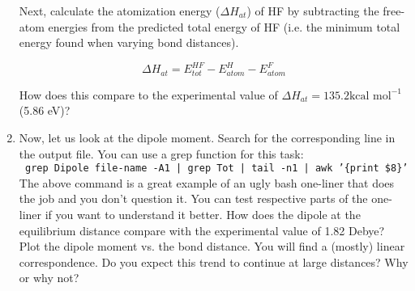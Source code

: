 \begin{enumerate}

Next, calculate the atomization energy ($\Delta H_{at}$) of HF by subtracting the free-atom energies from the predicted total energy of HF (i.e. the minimum total energy found when varying bond distances).

\begin{equation}
 \Delta H_{at}= E^{HF}_{tot} - E^{H}_{atom} - E^{F}_{atom}
\end{equation}

How does this compare to the experimental value of $\Delta H_{at}=135.2 \text{kcal mol}^{-1}$ (5.86 eV)? 

\item Now, let us look at the dipole moment. Search for the corresponding line in the output file. 
You can use a grep function for this task: \\ 
\texttt{ grep Dipole file-name  -A1 | grep Tot | tail -n1 | awk '\{print \$8\}'} \\
The above command is a great example of an ugly bash one-liner that does the job and you don't question it. 
You can test respective parts of the one-liner if you want to understand it better. 
How does the dipole at the equilibrium distance compare with the experimental value of 1.82 Debye? 
Plot the dipole moment vs. the bond distance. You will find a (mostly) linear correspondence. 
Do you expect this trend to continue at large distances?  Why or why not?


\end{enumerate}
